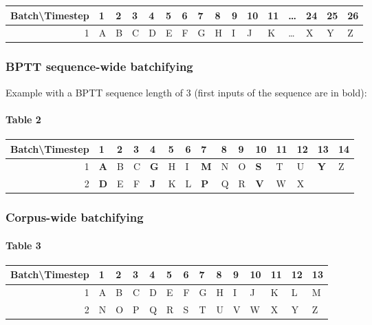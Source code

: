 \begin{tabular}[]{|r|lllllllllllllll|}
\hline
Batch\textbackslash Timestep & 1 & 2 & 3 & 4 & 5 & 6 & 7 & 8 & 9 & 10 & 11 & \ldots & 24 & 25 & 26\\
\hline
1 & A & B & C & D & E & F & G & H & I & J & K & \ldots & X & Y & Z\\
\hline
\end{tabular}

\subsubsection{BPTT sequence-wide batchifying}\label{table 2}

Example with a BPTT sequence length of 3 (first inputs of the sequence are in bold):

\paragraph{Table 2}

\begin{tabular}[]{|r|llllllllllllll|}
\hline
Batch\textbackslash Timestep & 1 & 2 & 3 & 4 & 5 & 6 & 7 & 8 & 9 & 10 & 11 & 12 & 13 & 14\\
\hline
1 & \textbf{A} & B & C & \textbf{G} & H & I & \textbf{M} & N & O &
\textbf{S} & T & U & \textbf{Y} & Z\\
2 & \textbf{D} & E & F & \textbf{J} & K & L & \textbf{P} & Q & R &
\textbf{V} & W & X & &\\
\hline
\end{tabular}

\subsubsection{Corpus-wide batchifying}\label{table 3}

\paragraph{Table 3}

\begin{tabular}[]{|r|lllllllllllll|}
\hline
Batch\textbackslash Timestep & 1 & 2 & 3 & 4 & 5 & 6 & 7 & 8 & 9 & 10 & 11 & 12 &
13\\
\hline
1 & A & B & C & D & E & F & G & H & I & J & K & L & M\\
2 & N & O & P & Q & R & S & T & U & V & W & X & Y & Z\\
\hline
\end{tabular}

